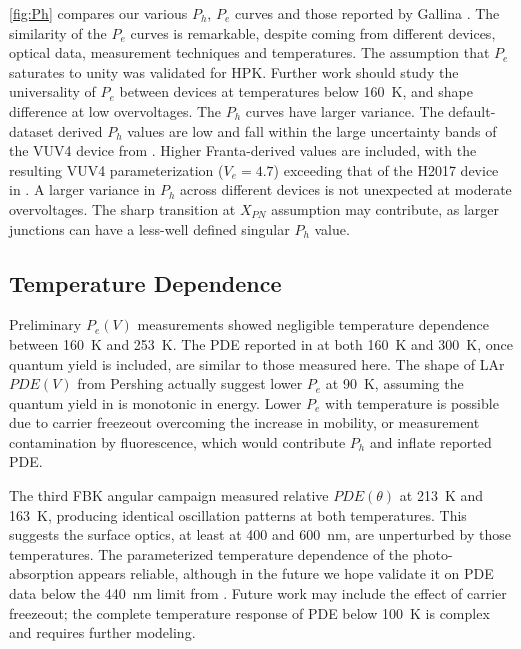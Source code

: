 \autoref{fig:Ph} compares our various $P_h$, $P_e$ curves and those reported by Gallina \cite{gallina_avalanche_2019}. The similarity of the $P_e$ curves is remarkable, despite coming from different devices, optical data, measurement techniques and temperatures. The assumption that $P_e$ saturates to unity was validated for HPK. Further work should study the universality of $P_e$ between devices at temperatures below 160~K, and shape difference at low overvoltages. %
The $P_h$ curves have larger variance. The default-dataset derived $P_h$ values are low and fall within the large uncertainty bands of the VUV4 device from \cite{gallina_avalanche_2019}. Higher Franta-derived values are included, with the resulting VUV4 parameterization ($V_e = 4.7$) exceeding that of the H2017 device in \cite{gallina_avalanche_2019}. %
A larger variance in $P_h$ across different devices is not unexpected at moderate overvoltages.%
The sharp transition at $X_{PN}$ assumption may contribute, as larger junctions can have a less-well defined singular $P_h$ value.

\subsection{Temperature Dependence} %
Preliminary $P_e(V)$ measurements showed negligible temperature dependence between 160~K and 253~K. The PDE reported in \cite{gallina_performance_2022} at both 160~K and 300~K, once quantum yield is included, are similar to those measured here. The shape of LAr $PDE(V)$ from Pershing \cite{Pershing_2022_argonPDE} actually suggest lower $P_e$ at 90~K, assuming the quantum yield in \cite{Lewis_2025_qy} is monotonic in energy. Lower $P_e$ with temperature is possible due to carrier freezeout overcoming the increase in mobility, or measurement contamination by fluorescence, which would contribute $P_h$ and inflate reported PDE.

The third FBK angular campaign measured relative $PDE(\theta)$ at 213~K and 163~K, producing identical oscillation patterns at both temperatures. This suggests the surface optics, at least at 400 and 600~nm, are unperturbed by those temperatures. The parameterized temperature dependence of the photo-absorption appears reliable, although in the future we hope validate it on PDE data below the 440~nm limit from \cite{siBandgap_dmPaper}. Future work may include the effect of carrier freezeout; the complete temperature response of PDE below 100~K is complex and requires further modeling.

